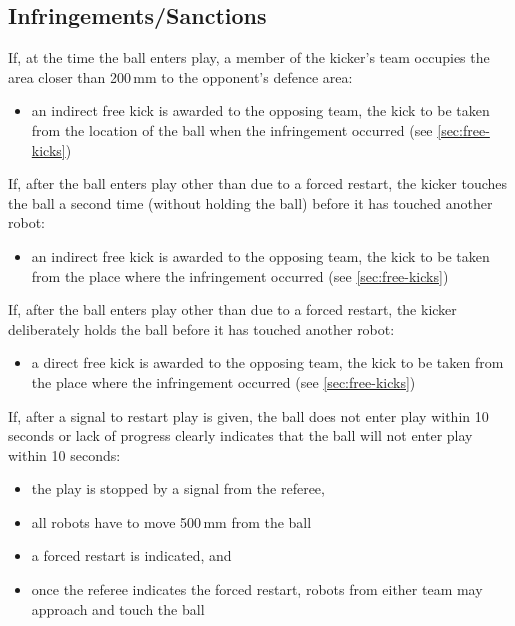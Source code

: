 \subsection{Infringements/Sanctions}
If, at the time the ball enters play, a member of the kicker's team occupies the area closer than 200\,mm to the opponent's defence area:
\begin{itemize}
\item an indirect free kick is awarded to the opposing team, the kick to be taken from the location of the ball when the infringement occurred (see \autoref{sec:free-kicks})
\end{itemize}

If, after the ball enters play other than due to a forced restart, the kicker touches the ball a second time (without holding the ball) before it has touched another robot:
\begin{itemize}
\item an indirect free kick is awarded to the opposing team, the kick to be taken from the place where the infringement occurred (see \autoref{sec:free-kicks})
\end{itemize}

If, after the ball enters play other than due to a forced restart, the kicker deliberately holds the ball before it has touched another robot:
\begin{itemize}
\item a direct free kick is awarded to the opposing team, the kick to be taken from the place where the infringement occurred (see \autoref{sec:free-kicks})
\end{itemize}

If, after a signal to restart play is given, the ball does not enter play within 10 seconds or lack of progress clearly indicates that the ball will not enter play within 10 seconds:
\begin{itemize}
\item the play is stopped by a signal from the referee,
\item all robots have to move 500\,mm from the ball
\item a forced restart is indicated, and
\item once the referee indicates the forced restart, robots from either team may approach and touch the ball
\end{itemize}

